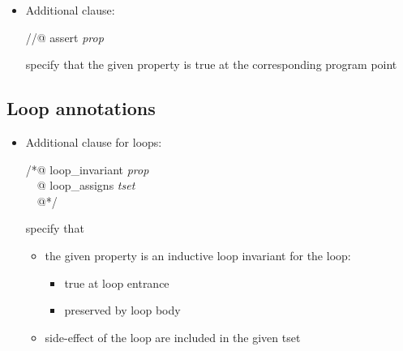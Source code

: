 \documentclass[a4paper,11pt,twoside,openright]{report}
\begin{document}
  \begin{itemize}
  \item Additional clause:
    \begin{flushleft}\ttfamily\color{blue}
      //@ assert \textsl{prop}
    \end{flushleft}
  specify that the given property is true at the corresponding
    program point

  \end{itemize}

\subsection{Loop annotations}

  \begin{itemize}
  \item Additional clause for loops:
    \begin{flushleft}\ttfamily\color{blue}
      /*@ loop\_invariant \textsl{prop} \\
      ~~@ loop\_assigns \textsl{tset} \\
      ~~@*/
    \end{flushleft}
    specify that
    \begin{itemize}
    \item the given property is an inductive loop invariant for the
      loop: 
      \begin{itemize}
      \item true at loop entrance
      \item preserved by loop body
      \end{itemize}
    \item side-effect of the loop are included in the given tset
    \end{itemize}
  \end{itemize}

  
\end{document}
